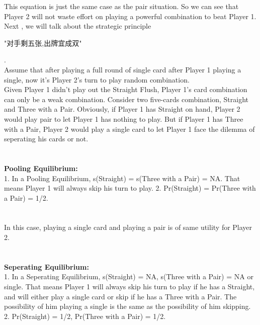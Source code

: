 \documentclass{article}
\begin{document}
This equation is just the same case as the pair situation. So we can see that Player 2 will not waste effort on playing a powerful combination to beat Player 1. \\
Next , we will talk about the strategic principle
\begin{CJK*}{UTF8}{gbsn}"对手剩五张,出牌宜成双" \end{CJK*}. \\
Assume that after playing a full round of single card after Player 1 playing a single, now it's Player 2's turn to play random combination.\\
Given Player 1 didn't play out the Straight Flush, Player 1's card combination can only be a weak combination. Consider two five-cards combination, Straight and Three with a Pair.
Obviously, if Player 1 has Straight on hand, Player 2 would play pair to let Player 1 has nothing to play. But if Player 1 has Three with a Pair, Player 2 would play a single card to let Player 1 face the dilemma of seperating his cards or not.\\
\\ \hspace*{\fill} \\
\textbf{Pooling Equilibrium:}\\
1. In a Pooling Equilibrium, s(Straight) = s(Three with a Pair) = NA. That means Player 1 will always skip his turn to play.
2. Pr(Straight) = Pr(Three with a Pair) = 1/2.\\
\\ \hspace*{\fill} \\
In this case, playing a single card and playing a pair is of same utility for Player 2.\\
\\ \hspace*{\fill} \\
\textbf{Seperating Equilibrium:}\\
1. In a Seperating Equilibrium, s(Straight) = NA, s(Three with a Pair) = NA or single. That means Player 1 will always skip his turn to play if he has a Straight, and will either play a single card or skip if he has a Three with a Pair. The possibility of him playing a single is the same as the possibility of him skipping.\\
2. Pr(Straight) = 1/2, Pr(Three with a Pair) = 1/2.\\
\\ \hspace*{\fill} \\
\end{document}
